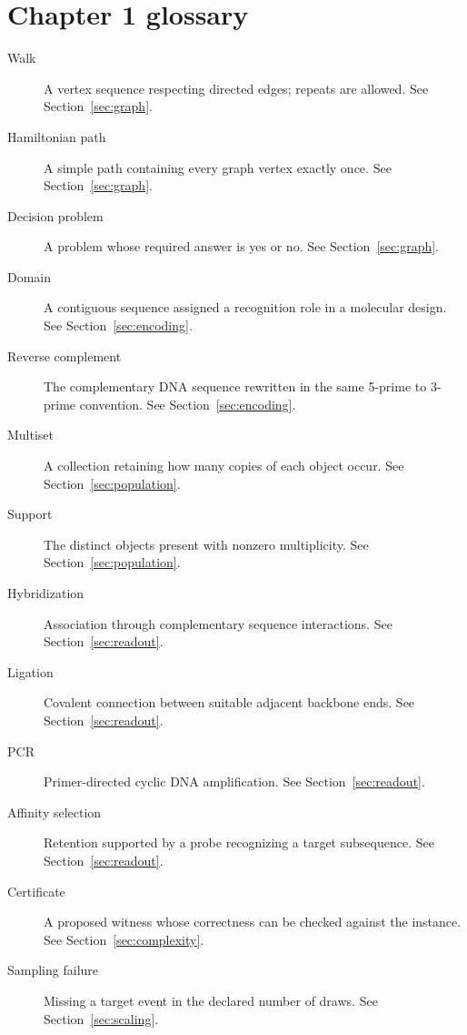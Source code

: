 \chapter*{Chapter 1 glossary}
\begin{description}
\item[Walk] A vertex sequence respecting directed edges; repeats are allowed. See Section~\ref{sec:graph}.
\item[Hamiltonian path] A simple path containing every graph vertex exactly once. See Section~\ref{sec:graph}.
\item[Decision problem] A problem whose required answer is yes or no. See Section~\ref{sec:graph}.
\item[Domain] A contiguous sequence assigned a recognition role in a molecular design. See Section~\ref{sec:encoding}.
\item[Reverse complement] The complementary DNA sequence rewritten in the same 5-prime to 3-prime convention. See Section~\ref{sec:encoding}.
\item[Multiset] A collection retaining how many copies of each object occur. See Section~\ref{sec:population}.
\item[Support] The distinct objects present with nonzero multiplicity. See Section~\ref{sec:population}.
\item[Hybridization] Association through complementary sequence interactions. See Section~\ref{sec:readout}.
\item[Ligation] Covalent connection between suitable adjacent backbone ends. See Section~\ref{sec:readout}.
\item[PCR] Primer-directed cyclic DNA amplification. See Section~\ref{sec:readout}.
\item[Affinity selection] Retention supported by a probe recognizing a target subsequence. See Section~\ref{sec:readout}.
\item[Certificate] A proposed witness whose correctness can be checked against the instance. See Section~\ref{sec:complexity}.
\item[Sampling failure] Missing a target event in the declared number of draws. See Section~\ref{sec:scaling}.
\end{description}
